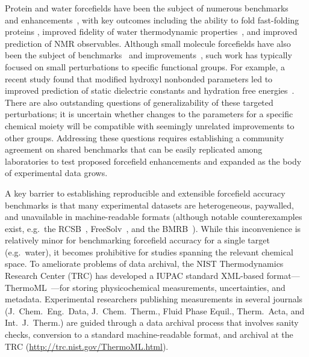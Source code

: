 \documentclass[aps,pre,twocolumn,nofootinbib,superscriptaddress,linenumbers]{revtex4-1}
\begin{document}
Protein and water forcefields have been the subject of numerous benchmarks~\cite{lindorff2012systematic} and enhancements~\cite{li2011iterative, best2012optimization, Lindorff-Larsen2010}, with key outcomes including the ability to fold fast-folding proteins \cite{shaw2011, ensign2007heterogeneity, Voelz2010}, improved fidelity of water thermodynamic properties~\cite{horn2004}, and improved prediction of NMR observables.  
Although small molecule forcefields have also been the subject of benchmarks~\cite{caleman2011force} and improvements~\cite{fennell2014fixed}, such work has typically focused on small perturbations to specific functional groups.  
For example, a recent study found that modified hydroxyl nonbonded parameters led to improved prediction of static dielectric constants and hydration free energies~\cite{fennell2014fixed}.
There are also outstanding questions of generalizability of these targeted perturbations; it is uncertain whether changes to the parameters for a specific chemical moiety will be compatible with seemingly unrelated improvements to other groups.
Addressing these questions requires establishing a community agreement on shared benchmarks that can be easily replicated among laboratories to test proposed forcefield enhancements and expanded as the body of experimental data grows.

A key barrier to establishing reproducible and extensible forcefield accuracy benchmarks is that many experimental datasets are heterogeneous, paywalled, and unavailable in machine-readable formats (although notable counterexamples exist, e.g.~the RCSB~\cite{Berman2000}, FreeSolv~\cite{freesolv}, and the BMRB~\cite{Ulrich2008}).  
While this inconvenience is relatively minor for benchmarking forcefield accuracy for a single target (e.g.~water), it becomes prohibitive for studies spanning the relevant chemical space.  
To ameliorate problems of data archival, the NIST Thermodynamics Research Center (TRC) has developed a IUPAC standard XML-based format---ThermoML~\cite{frenkel2006xml}---for storing physicochemical measurements, uncertainties, and metadata.
Experimental researchers publishing measurements in several journals (J.~Chem.~Eng.~Data, J.~Chem.~Therm., Fluid Phase Equil., Therm.~Acta, and Int.~J.~Therm.) are guided through a data archival process that involves sanity checks, conversion to a standard machine-readable format, and archival at the TRC (\url{http://trc.nist.gov/ThermoML.html}).  
\end{document}
